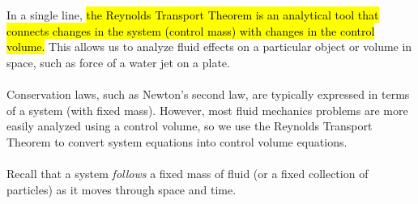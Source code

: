 ﻿\documentclass[12pt]{article}
\begin{document}
\section*{}
In a single line, \hl{the Reynolds Transport Theorem is an analytical tool that connects changes in the system (control mass) with changes in the control volume.} This allows us to analyze fluid effects on a particular object or volume in space, such as force of a water jet on a plate.\\\\
Conservation laws, such as Newton's second law, are typically expressed in terms of a system (with fixed mass). However, most fluid mechanics problems are more easily analyzed using a control volume, so we use the Reynolds Transport Theorem to convert system equations into control volume equations.\\\\
Recall that a system \textit{follows} a fixed mass of fluid (or a fixed collection of particles) as it moves through space and time.
\end{document}

